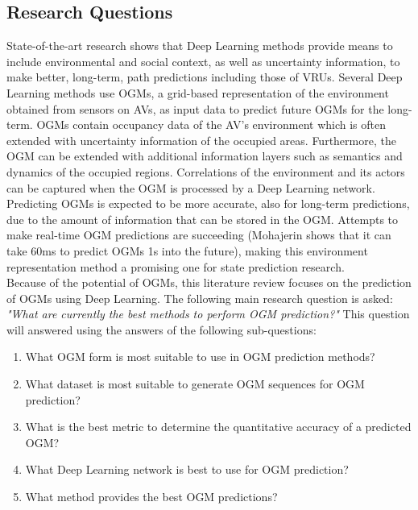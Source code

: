 \subsection{Research Questions}
State-of-the-art research shows that Deep Learning methods provide means to include environmental and social context, as well as uncertainty information, to make better, long-term, path predictions including those of \glspl{VRU}. Several Deep Learning methods use \glspl{OGM}, a grid-based representation of the environment obtained from sensors on \glspl{AV}, as input data to predict future \glspl{OGM} for the long-term. \glspl{OGM} contain occupancy data of the \gls{AV}'s environment which is often extended with uncertainty information of the occupied areas. Furthermore, the \gls{OGM} can be extended with additional information layers such as semantics and dynamics of the occupied regions. Correlations of the environment and its actors can be captured when the \gls{OGM} is processed by a Deep Learning network. Predicting \glspl{OGM} is expected to be more accurate, also for long-term predictions, due to the amount of information that can be stored in the OGM. Attempts to make real-time \gls{OGM} predictions are succeeding (Mohajerin \cite{mohajerin2019multi} shows that it can take 60ms to predict \glspl{OGM} 1s into the future), making this environment representation method a promising one for state prediction research. \\
 
Because of the potential of \glspl{OGM}, this literature review focuses on the prediction of \glspl{OGM} using Deep Learning. The following main research question is asked: \textit{"What are currently the best methods to perform \gls{OGM} prediction?"} 
This question will answered using the answers of the following sub-questions:

\begin{enumerate}
	\item What OGM form is most suitable to use in OGM prediction methods?
	\item What dataset is most suitable to generate OGM sequences for OGM prediction?
	\item What is the best metric to determine the quantitative accuracy of a predicted OGM?
	\item What Deep Learning network is best to use for OGM prediction?
	\item What method provides the best OGM predictions?
\end{enumerate}


